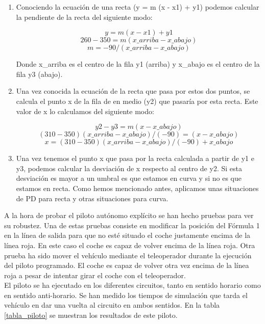 \begin{enumerate}
    \item Conociendo la ecuación de una recta (y = m (x - x1) + y1) podemos calcular la pendiente de la recta del siguiente modo:
    
        \[ y = m (x - x1) + y1 \]
        \[ 260 - 350 = m (x\_arriba - x\_abajo) \]
        \[ m = -90 / (x\_arriba - x\_abajo) \]
        
     Donde x\_arriba es el centro de la fila y1 (arriba) y x\_abajo es el centro de la fila y3 (abajo).
        
    \item Una vez conocida la ecuación de la recta que pasa por estos dos puntos, se calcula el punto x de la fila de en medio (y2) que pasaría por esta recta. Este valor de x lo calculamos del siguiente modo:
        
        \[ y2 - y3 = m (x - x\_abajo) \]
        \[ (310 - 350) (x\_arriba - x\_abajo) / (-90) = (x - x\_abajo)  \]
        \[ x = (310 - 350) (x\_arriba - x\_abajo) / (-90) + x\_abajo  \]
        
    \item  Una vez tenemos el punto x que pasa por la recta calculada a partir de y1 e y3, podemos calcular la desviación de x respecto al centro de y2. Si esta desviación es mayor a un umbral es que estamos en curva y si no es que estamos en recta. Como hemos mencionado antes, aplicamos unas situaciones de PD para recta y otras situaciones para curva.
    
\end{enumerate}

A la hora de probar el piloto autónomo explícito se han hecho pruebas para ver su robustez. Una de estas pruebas consiste en modificar la posición del Fórmula 1 en la línea de salida para que no esté situado el coche justamente encima de la línea roja. En este caso el coche es capaz de volver encima de la línea roja. Otra prueba ha sido mover el vehículo mediante el teleoperador durante la ejecución del piloto programado. El coche es capaz de volver otra vez encima de la línea roja a pesar de intentar girar el coche con el teleoperador.\\

El piloto se ha ejecutado en los diferentes circuitos, tanto en sentido horario como en sentido anti-horario. Se han medido los tiempos de simulación que tarda el vehículo en dar una vuelta al circuito en ambos sentidos. En la tabla \ref{tabla_piloto} se muestran los resultados de este piloto.\\



